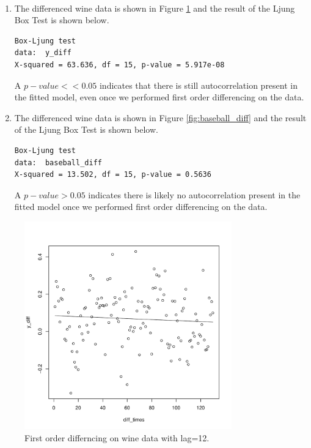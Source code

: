 \documentclass[12pt]{article}
\newenvironment{solution}[2][Solution]{\begin{trivlist}
\item[\hskip \labelsep {\bfseries #1}]}{\end{trivlist}}
\begin{document}
\begin{solution}{}
$ $
\begin{enumerate}[label=(\alph*)]
    \item The differenced wine data is shown in Figure \ref{fig:wine_diff} and the result of the Ljung Box Test is shown below.
    \begin{lstlisting}
Box-Ljung test
data:  y_diff
X-squared = 63.636, df = 15, p-value = 5.917e-08
    \end{lstlisting}
    A $p-value << 0.05$ indicates that there is still autocorrelation present in the fitted model, even once we performed first order differencing on the data.
    \item The differenced wine data is shown in Figure \ref{fig:baseball_diff} and the result of the Ljung Box Test is shown below.
    \begin{lstlisting}
Box-Ljung test
data:  baseball_diff
X-squared = 13.502, df = 15, p-value = 0.5636
    \end{lstlisting}
    A $p-value > 0.05$ indicates there is likely no autocorrelation present in the fitted model once we performed first order differencing on the data.
\end{enumerate}

\begin{figure}
    \centering
    \includegraphics[width=0.8\textwidth]{figs/problem_10/wine_diff_lag12.pdf}
    \vspace*{-0.5cm}
    \caption{First order differncing on wine data with lag=12.}
    \label{fig:wine_diff}
\end{figure}


\end{solution}
\end{document}
